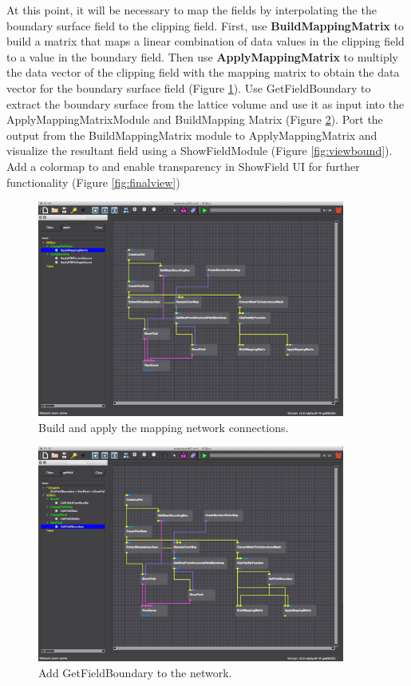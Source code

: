 \documentclass[fleqn,11pt,openany]{book}
\begin{document}
At this point, it will be necessary to map the fields by interpolating the the boundary surface field to the clipping field.
First, use \textbf{BuildMappingMatrix} to build a matrix that maps a linear combination of data values in the clipping field to a value in the boundary field. Then use \textbf{ApplyMappingMatrix} to multiply the data vector of the clipping field with the mapping matrix to obtain the data vector for the boundary surface field (Figure \ref{fig:mappingmatrix}). Use GetFieldBoundary to extract the boundary surface from the lattice volume and use it as input into the ApplyMappingMatrixModule and BuildMapping Matrix (Figure \ref{fig:highlightmods}). Port the output from the BuildMappingMatrix module to ApplyMappingMatrix and visualize the resultant field using a ShowFieldModule (Figure \ref{fig:viewbound}). Add a colormap to and enable transparency in ShowField UI for further functionality (Figure \ref{fig:finalview})

\begin{figure}[H]
\center
\includegraphics[width=0.9\textwidth]{BasicTutorial_figures/mappingmatrix.png}
\caption{Build and apply the mapping network connections.}
\label{fig:mappingmatrix}
\end{figure}

\begin{figure}[H]
\center
\includegraphics[width=0.9\textwidth]{BasicTutorial_figures/fieldboundary.png}
\caption{Add GetFieldBoundary to the network.}
\label{fig:highlightmods}
\end{figure}
\end{document}

